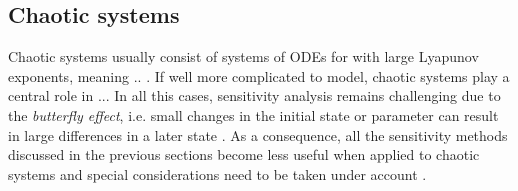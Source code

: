 





\subsection{Chaotic systems}



Chaotic systems usually consist of systems of ODEs for with large Lyapunov exponents, meaning .. .
If well more complicated to model, chaotic systems play a central role in ... 
In all this cases, sensitivity analysis remains challenging due to the \textit{butterfly effect}, i.e. small changes in the initial state or parameter can result in large differences in a later state \cite{Lorenz.1963}.
As a consequence, all the sensitivity methods discussed in the previous sections become less useful when applied to chaotic systems and special considerations need to be taken under account \cite{Wang2012-chaos-adjoint}.

